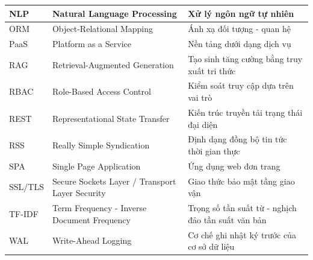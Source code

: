 \begin{longtable}{|p{3.2cm}|p{5.8cm}|p{5.5cm}|}
\hline
NLP & Natural Language Processing & Xử lý ngôn ngữ tự nhiên \\
\hline
ORM & Object-Relational Mapping & Ánh xạ đối tượng - quan hệ \\
\hline
PaaS & Platform as a Service & Nền tảng dưới dạng dịch vụ \\
\hline
RAG & Retrieval-Augmented Generation & Tạo sinh tăng cường bằng truy xuất tri thức \\
\hline
RBAC & Role-Based Access Control & Kiểm soát truy cập dựa trên vai trò \\
\hline
REST & Representational State Transfer & Kiến trúc truyền tải trạng thái đại diện \\
\hline
RSS & Really Simple Syndication & Định dạng đồng bộ tin tức thời gian thực \\
\hline
SPA & Single Page Application & Ứng dụng web đơn trang \\
\hline
SSL/TLS & Secure Sockets Layer / Transport Layer Security & Giao thức bảo mật tầng giao vận \\
\hline
TF-IDF & Term Frequency - Inverse Document Frequency & Trọng số tần suất từ - nghịch đảo tần suất văn bản \\
\hline
WAL & Write-Ahead Logging & Cơ chế ghi nhật ký trước của cơ sở dữ liệu \\
\hline
\end{longtable}
